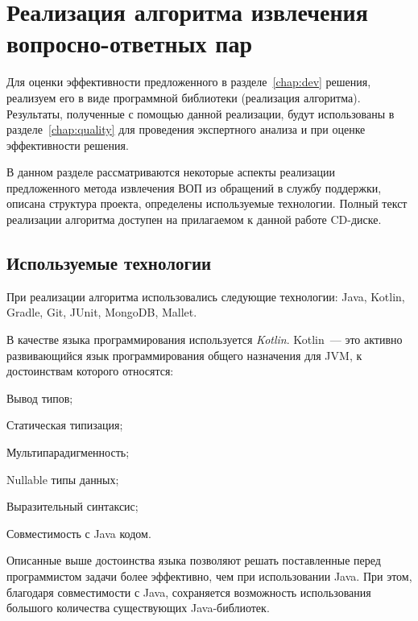 \chapter{Реализация алгоритма извлечения вопросно-ответных пар}
\label{chap:impl}

Для оценки эффективности предложенного в разделе~\ref{chap:dev} решения, реализуем его в виде программной библиотеки (реализация алгоритма). Результаты, полученные с помощью данной реализации, будут использованы в разделе~\ref{chap:quality} для проведения экспертного анализа и при оценке эффективности решения.

В данном разделе рассматриваются некоторые аспекты реализации предложенного метода извлечения ВОП из обращений в службу поддержки, описана структура проекта, определены используемые технологии. Полный текст реализации алгоритма доступен на прилагаемом к данной работе CD-диске.

\section{Используемые технологии}
При реализации алгоритма использовались следующие технологии: Java, Kotlin, Gradle, Git, JUnit, MongoDB, Mallet.

В качестве языка программирования используется \textit{Kotlin}. Kotlin~--- это активно развивающийся язык программирования общего назначения для JVM, к достоинствам которого относятся:


\begin{itemize*}
\item Вывод типов;
\item Статическая типизация;
\item Мультипарадигменность;
\item Nullable типы данных;
\item Выразительный синтаксис;
\item Совместимость с Java кодом.
\end{itemize*}

Описанные выше достоинства языка позволяют решать поставленные перед программистом задачи более эффективно, чем при использовании Java. При этом, благодаря совместимости с Java, сохраняется возможность использования большого количества существующих Java-библиотек.

